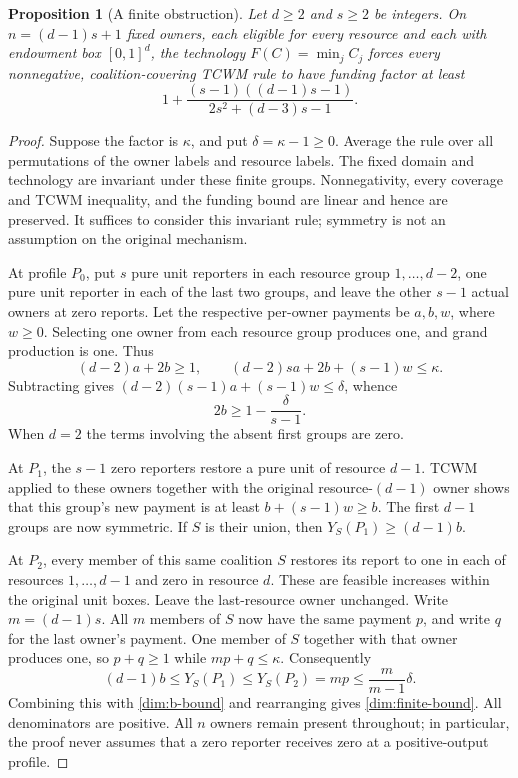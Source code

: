 \documentclass[11pt]{article}
\newtheorem{proposition}[theorem]{Proposition}
\theoremstyle{definition}\newtheorem{definition}[theorem]{Definition}
\theoremstyle{remark}\newtheorem{remark}[theorem]{Remark}
\begin{document}
\begin{proposition}[A finite obstruction]\label{dim:finite-lower}
Let $d\ge2$ and $s\ge2$ be integers. On $n=(d-1)s+1$ fixed owners,
each eligible for every resource and each with endowment box $[0,1]^d$,
the technology $F(C)=\min_jC_j$ forces every nonnegative,
coalition-covering TCWM rule to have funding factor at least
\begin{equation}\label{dim:finite-bound}
 1+\frac{(s-1)((d-1)s-1)}{2s^2+(d-3)s-1}.
\end{equation}
\end{proposition}

\begin{proof}
Suppose the factor is $\kappa$, and put $\delta=\kappa-1\ge0$.
Average the rule over all permutations of the owner labels and resource
labels. The fixed domain and technology are invariant under these finite
groups. Nonnegativity, every coverage and TCWM inequality, and the funding
bound are linear and hence are preserved. It suffices to consider this
invariant rule; symmetry is not an assumption on the original mechanism.

At profile $P_0$, put $s$ pure unit reporters in each resource group
$1,\ldots,d-2$, one pure unit reporter in each of the last two groups,
and leave the other $s-1$ actual owners at zero reports. Let the respective
per-owner payments be $a,b,w$, where $w\ge0$. Selecting one owner from
each resource group produces one, and grand production is one. Thus
\[
 (d-2)a+2b\ge1,\qquad
 (d-2)sa+2b+(s-1)w\le\kappa.
\]
Subtracting gives $(d-2)(s-1)a+(s-1)w\le\delta$, whence
\begin{equation}\label{dim:b-bound}
 2b\ge1-\frac{\delta}{s-1}.
\end{equation}
When $d=2$ the terms involving the absent first groups are zero.

At $P_1$, the $s-1$ zero reporters restore a pure unit of resource $d-1$.
TCWM applied to these owners together with the original resource-$(d-1)$
owner shows that this group's new payment is at least $b+(s-1)w\ge b$.
The first $d-1$ groups are now symmetric. If $S$ is their union, then
$Y_S(P_1)\ge(d-1)b$.

At $P_2$, every member of this same coalition $S$ restores its report to
one in each of resources $1,\ldots,d-1$ and zero in resource $d$.
These are feasible increases within the original unit boxes. Leave the
last-resource owner unchanged. Write $m=(d-1)s$. All $m$ members of $S$
now have the same payment $p$, and write $q$ for the last owner's payment.
One member of $S$ together with that owner produces one, so
$p+q\ge1$ while $mp+q\le\kappa$. Consequently
\[
 (d-1)b\le Y_S(P_1)\le Y_S(P_2)=mp
 \le\frac{m}{m-1}\delta.
\]
Combining this with \eqref{dim:b-bound} and rearranging gives
\eqref{dim:finite-bound}. All denominators are positive. All $n$ owners
remain present throughout; in particular, the proof never assumes that a
zero reporter receives zero at a positive-output profile.
\end{proof}
\end{document}
